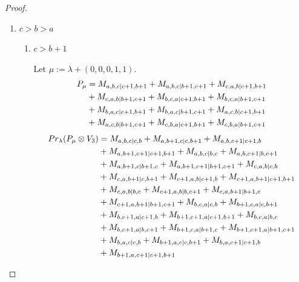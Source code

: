 \begin{proof}
\begin{enumerate}
  \item $c>b>a$
\begin{enumerate}
  \item $c>b+1$ \par
        Let $\mu:=\lambda + (0,0,0,1,1) $.
        \begin{equation}\notag
          \begin{aligned}
            P_\mu &= M_{a,b,c|c+1,b+1}
+ M_{a,b,c|b+1,c+1}
+ M_{c,a,b|c+1,b+1}\\
                                              &
+ M_{c,a,b|b+1,c+1}
+ M_{b,c,a|c+1,b+1}
+ M_{b,c,a|b+1,c+1}\\
                                              &
+ M_{b,a,c|c+1,b+1}
+ M_{b,a,c|b+1,c+1}
+ M_{a,c,b|c+1,b+1}\\
                                              &
+ M_{a,c,b|b+1,c+1}
+ M_{c,b,a|c+1,b+1}
+ M_{c,b,a|b+1,c+1}
          \end{aligned}
        \end{equation}
        \begin{equation}\notag
          \begin{aligned}
            Pr_{\lambda}(P_\mu \otimes V_{3}) &=
M_{a,b,c|c,b}
+ M_{a,b+1,c|c,b+1}
+ M_{a,b,c+1|c+1,b}\\
                                              &
+ M_{a,b+1,c+1|c+1,b+1}
+ M_{a,b,c|b,c}
+ M_{a,b,c+1|b,c+1}\\
                                              &
+ M_{a,b+1,c|b+1,c}
+ M_{a,b+1,c+1|b+1,c+1}
+ M_{c,a,b|c,b}\\
                                              &
+ M_{c,a,b+1|c,b+1}
+ M_{c+1,a,b|c+1,b}
+ M_{c+1,a,b+1|c+1,b+1}\\
                                              &
+ M_{c,a,b|b,c}
+ M_{c+1,a,b|b,c+1}
+ M_{c,a,b+1|b+1,c}\\
                                              &
+ M_{c+1,a,b+1|b+1,c+1}
+ M_{b,c,a|c,b}
+ M_{b+1,c,a|c,b+1}\\
                                              &
+ M_{b,c+1,a|c+1,b}
+ M_{b+1,c+1,a|c+1,b+1}
+ M_{b,c,a|b,c}\\
                                              &
+ M_{b,c+1,a|b,c+1}
+ M_{b+1,c,a|b+1,c}
+ M_{b+1,c+1,a|b+1,c+1}\\
                                              &
+ M_{b,a,c|c,b}
+ M_{b+1,a,c|c,b+1}
+ M_{b,a,c+1|c+1,b}\\
                                              &
+ M_{b+1,a,c+1|c+1,b+1}

\end{aligned}
\end{equation}
\end{enumerate}
\end{enumerate}
\end{proof}
